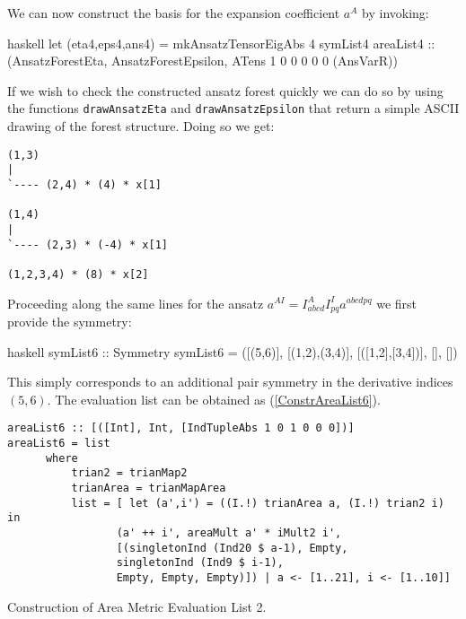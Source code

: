 We can now construct the basis for the expansion coefficient $a^{A}$ by invoking:
\begin{center}
\begin{cminted}{haskell}
let (eta4,eps4,ans4) = mkAnsatzTensorEigAbs 4 symList4 areaList4 :: 
                         (AnsatzForestEta, AnsatzForestEpsilon,
                         ATens 1 0 0 0 0 0 (AnsVarR))
\end{cminted}
\end{center}
If we wish to check the constructed ansatz forest quickly we can do so by using the functions \texttt{drawAnsatzEta} and \texttt{drawAnsatzEpsilon} that return a simple ASCII drawing of the forest structure. Doing so we get:
\begin{center}
\begin{BVerbatim}
(1,3)
|
`---- (2,4) * (4) * x[1]

(1,4)
|
`---- (2,3) * (-4) * x[1]

(1,2,3,4) * (8) * x[2]
\end{BVerbatim}
\end{center}
Proceeding along the same lines for the ansatz $a^{AI} = I^A _{abcd} I^I_{pq} a^{abcdpq}$ we first provide the symmetry:
\begin{center}
\begin{cminted}{haskell}
symList6 :: Symmetry
symList6 = ([(5,6)], [(1,2),(3,4)], [([1,2],[3,4])], [], [])
\end{cminted}
\end{center}
This simply corresponds to an additional pair symmetry in the derivative indices $(5,6)$. The evaluation list can be obtained as (\ref{ConstrAreaList6}).
\begin{listing}[hbt!]
\begin{verbatim}
areaList6 :: [([Int], Int, [IndTupleAbs 1 0 1 0 0 0])]
areaList6 = list
      where
          trian2 = trianMap2
          trianArea = trianMapArea
          list = [ let (a',i') = ((I.!) trianArea a, (I.!) trian2 i) in
                 (a' ++ i', areaMult a' * iMult2 i', 
                 [(singletonInd (Ind20 $ a-1), Empty,
                 singletonInd (Ind9 $ i-1),
                 Empty, Empty, Empty)]) | a <- [1..21], i <- [1..10]]
\end{verbatim} 
\caption{Construction of Area Metric Evaluation List 2.}\label{ConstrAreaList6}
\end{listing}

